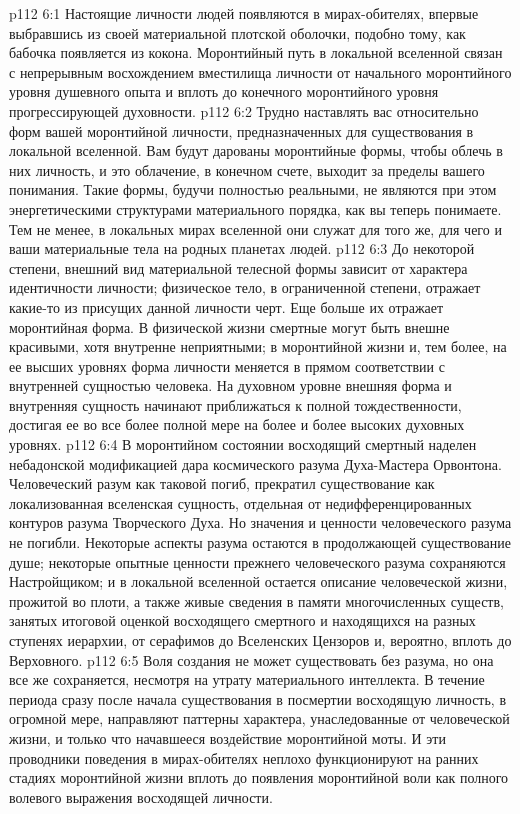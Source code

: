 \vs p112 6:1 Настоящие личности людей появляются в мирах\hyp{}обителях, впервые выбравшись из своей материальной плотской оболочки, подобно тому, как бабочка появляется из кокона. Моронтийный путь в локальной вселенной связан с непрерывным восхождением вместилища личности от начального моронтийного уровня душевного опыта и вплоть до конечного моронтийного уровня прогрессирующей духовности.
\vs p112 6:2 Трудно наставлять вас относительно форм вашей моронтийной личности, предназначенных для существования в локальной вселенной. Вам будут дарованы моронтийные формы, чтобы облечь в них личность, и это облачение, в конечном счете, выходит за пределы вашего понимания. Такие формы, будучи полностью реальными, не являются при этом энергетическими структурами материального порядка, как вы теперь понимаете. Тем не менее, в локальных мирах вселенной они служат для того же, для чего и ваши материальные тела на родных планетах людей.
\vs p112 6:3 До некоторой степени, внешний вид материальной телесной формы зависит от характера идентичности личности; физическое тело, в ограниченной степени, отражает какие\hyp{}то из присущих данной личности черт. Еще больше их отражает моронтийная форма. В физической жизни смертные могут быть внешне красивыми, хотя внутренне неприятными; в моронтийной жизни и, тем более, на ее высших уровнях форма личности меняется в прямом соответствии с внутренней сущностью человека. На духовном уровне внешняя форма и внутренняя сущность начинают приближаться к полной тождественности, достигая ее во все более полной мере на более и более высоких духовных уровнях.
\vs p112 6:4 \pc В моронтийном состоянии восходящий смертный наделен небадонской модификацией дара космического разума Духа\hyp{}Мастера Орвонтона. Человеческий разум как таковой погиб, прекратил существование как локализованная вселенская сущность, отдельная от недифференцированных контуров разума Творческого Духа. Но значения и ценности человеческого разума не погибли. Некоторые аспекты разума остаются в продолжающей существование душе; некоторые опытные ценности прежнего человеческого разума сохраняются Настройщиком; и в локальной вселенной остается описание человеческой жизни, прожитой во плоти, а также живые сведения в памяти многочисленных существ, занятых итоговой оценкой восходящего смертного и находящихся на разных ступенях иерархии, от серафимов до Вселенских Цензоров и, вероятно, вплоть до Верховного.
\vs p112 6:5 Воля создания не может существовать без разума, но она все же сохраняется, несмотря на утрату материального интеллекта. В течение периода сразу после начала существования в посмертии восходящую личность, в огромной мере, направляют паттерны характера, унаследованные от человеческой жизни, и только что начавшееся воздействие моронтийной моты. И эти проводники поведения в мирах\hyp{}обителях неплохо функционируют на ранних стадиях моронтийной жизни вплоть до появления моронтийной воли как полного волевого выражения восходящей личности.
